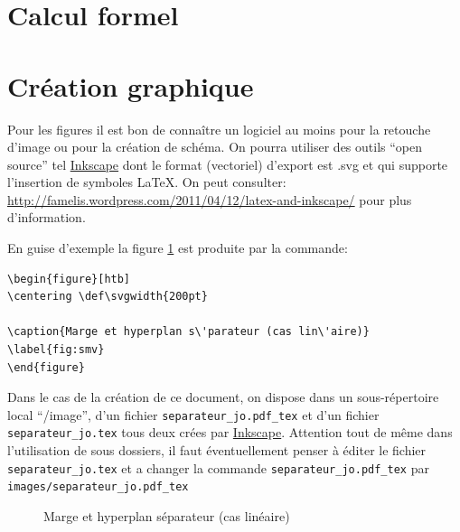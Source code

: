 \documentclass[a4paper,10pt]{book_ad}
\begin{document}





\section{Calcul formel}


\section{Cr\'eation graphique}
Pour les figures il est bon de connaître un
logiciel au moins pour la retouche d'image ou pour la création de schéma.
On pourra utiliser des outils ``open source'' tel  \href{http://inkscape.org/}{Inkscape}
 dont le format (vectoriel)
d'export est .svg et qui supporte l'insertion de symboles \LaTeX. 
 On peut consulter: \url{http://famelis.wordpress.com/2011/04/12/latex-and-inkscape/}
pour plus d'information.

En guise d'exemple la figure \ref{fig:smv} est produite par la commande:
\begin{lstlisting}
\begin{figure}[htb] 
\centering \def\svgwidth{200pt} 
 
\caption{Marge et hyperplan s\'parateur (cas lin\'aire)} 
\label{fig:smv}
\end{figure}
\end{lstlisting}
Dans le cas de la création de ce document, on dispose dans un sous-répertoire local ``/image'',
d'un fichier \lstinline+separateur_jo.pdf_tex+ et d'un fichier \lstinline+separateur_jo.tex+
tous deux crées par \href{http://inkscape.org/}{Inkscape}.
Attention tout de m\^eme dans l'utilisation de sous dossiers,
il faut éventuellement penser \`a éditer le fichier
\lstinline+separateur_jo.tex+
et a changer la commande \lstinline+separateur_jo.pdf_tex+
par \lstinline+images/separateur_jo.pdf_tex+




\begin{figure}[htb] 
\centering \def\svgwidth{420pt} 
 
\caption{Marge et hyperplan séparateur (cas linéaire)} 
\label{fig:smv}
\end{figure}
\end{document}
